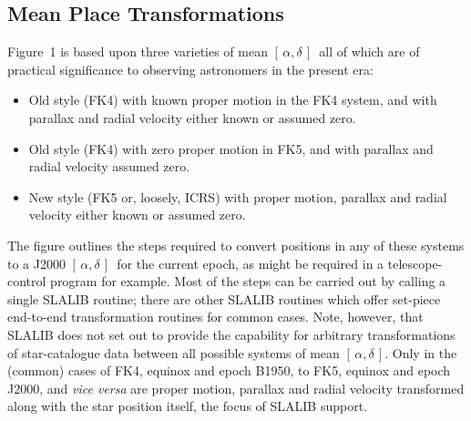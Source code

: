 \documentclass[11pt,twoside,nolof]{starlink}
\providecommand{\radec}     {$[\,\alpha,\delta\,]$}
\begin{document}
\subsection{Mean Place Transformations}
Figure~1 is based upon three varieties of mean \radec\ all of which are
of practical significance to observing astronomers in the present era:
\begin{itemize}
   \item Old style (FK4) with known proper motion in the FK4
         system, and with parallax and radial velocity either
         known or assumed zero.
   \item Old style (FK4) with zero proper motion in FK5,
         and with parallax and radial velocity assumed zero.
   \item New style (FK5 or, loosely, ICRS)
         with proper motion, parallax and
         radial velocity either known or assumed zero.
\end{itemize}
The figure outlines the steps required to convert positions in
any of these systems to a J2000 \radec\ for the current
epoch, as might be required in a telescope-control
program for example.
Most of the steps can be carried out by calling a single
SLALIB routine;  there are other SLALIB routines which
offer set-piece end-to-end transformation routines for common cases.
Note, however, that SLALIB does not set out to provide the capability
for arbitrary transformations of star-catalogue data
between all possible systems of mean \radec.
Only in the (common) cases of FK4, equinox and epoch B1950,
to FK5, equinox and epoch J2000, and \textit{vice versa}\/ are
proper motion, parallax and radial velocity transformed
along with the star position itself, the
focus of SLALIB support.
\end{document}
